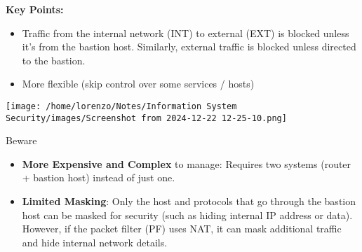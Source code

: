 \begin{minipage}{0.5\textwidth}
	\vspace{-1.5cm}
    \textbf{Key Points:}
    \begin{itemize}
        \item Traffic from the internal network (INT) to external (EXT) is blocked unless it’s from the bastion host. Similarly, external traffic is blocked unless directed to the bastion.
        \item More flexible (skip control over some services / hosts)
    \end{itemize}
\end{minipage} 
\hfill
\begin{minipage}{0.5\textwidth}
    \centering
    \texttt{[image: 
        /home/lorenzo/Notes/Information System Security/images/Screenshot from 2024-12-22 12-25-10.png]}
\end{minipage}
\begin{center}
    \begin{quotebox-red}{Beware}
        \begin{itemize}
            \item \textbf{More Expensive and Complex} 
       to manage: Requires two systems (router + bastion host) instead of just one.
       \item \textbf{Limited Masking}: Only the host and protocols that go through the bastion host can be masked for security (such as hiding internal IP address or data). However, if the packet filter (PF) uses NAT, it can mask additional traffic and hide internal network details.
     \end{itemize}
    \end{quotebox-red}   
\end{center}

